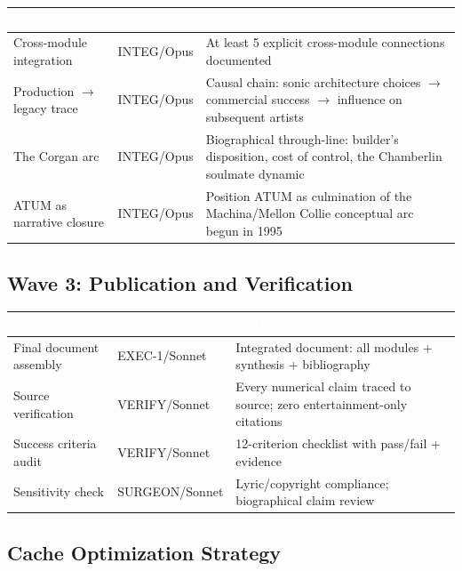 \documentclass[11pt,letterpaper]{article}
\newcommand{\tableheader}[1]{\textbf{\sffamily\textcolor{white}{#1}}}
\begin{document}
\begin{center}
\begin{tabularx}{\textwidth}{L{3cm}L{2.5cm}X}
\toprule
{}
\tableheader{Task} & \tableheader{Agent} & \tableheader{Output} \\
\midrule
Cross-module integration & INTEG/Opus & At least 5 explicit cross-module connections documented \\
Production $\to$ legacy trace & INTEG/Opus & Causal chain: sonic architecture choices $\to$ commercial success $\to$ influence on subsequent artists \\
The Corgan arc & INTEG/Opus & Biographical through-line: builder's disposition, cost of control, the Chamberlin soulmate dynamic \\
ATUM as narrative closure & INTEG/Opus & Position ATUM as culmination of the Machina/Mellon Collie conceptual arc begun in 1995 \\
\bottomrule
\end{tabularx}
\end{center}

\subsection{Wave 3: Publication and Verification}

\begin{center}
\begin{tabularx}{\textwidth}{L{3cm}L{2.5cm}X}
\toprule
{}
\tableheader{Task} & \tableheader{Agent} & \tableheader{Output} \\
\midrule
Final document assembly & EXEC-1/Sonnet & Integrated document: all modules + synthesis + bibliography \\
Source verification & VERIFY/Sonnet & Every numerical claim traced to source; zero entertainment-only citations \\
Success criteria audit & VERIFY/Sonnet & 12-criterion checklist with pass/fail + evidence \\
Sensitivity check & SURGEON/Sonnet & Lyric/copyright compliance; biographical claim review \\
\bottomrule
\end{tabularx}
\end{center}

\subsection{Cache Optimization Strategy}
\end{document}
